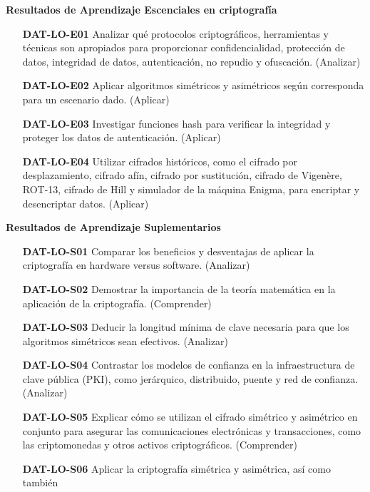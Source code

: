 \noindent \textbf{Resultados de Aprendizaje Escenciales en criptografía}
\begin{itemize}
\item[\textbf{DAT-LO-E01}] Analizar qué protocolos criptográficos, herramientas y técnicas son apropiados para proporcionar confidencialidad, protección de datos, integridad de datos, autenticación, no repudio y ofuscación. (Analizar)
\item[\textbf{DAT-LO-E02}] Aplicar algoritmos simétricos y asimétricos según corresponda para un escenario dado. (Aplicar)
\item[\textbf{DAT-LO-E03}] Investigar funciones hash para verificar la integridad y proteger los datos de autenticación. (Aplicar)
\item[\textbf{DAT-LO-E04}] Utilizar cifrados históricos, como el cifrado por desplazamiento, cifrado afín, cifrado por sustitución, cifrado de Vigenère, ROT-13, cifrado de Hill y simulador de la máquina Enigma, para encriptar y desencriptar datos. (Aplicar)
\end{itemize}


\noindent \textbf{Resultados de Aprendizaje Suplementarios}
\begin{itemize}
\item[\textbf{DAT-LO-S01}] Comparar los beneficios y desventajas de aplicar la criptografía en hardware versus software. (Analizar)
\item[\textbf{DAT-LO-S02}] Demostrar la importancia de la teoría matemática en la aplicación de la criptografía. (Comprender)
\item[\textbf{DAT-LO-S03}] Deducir la longitud mínima de clave necesaria para que los algoritmos simétricos sean efectivos. (Analizar)
\item[\textbf{DAT-LO-S04}] Contrastar los modelos de confianza en la infraestructura de clave pública (PKI), como jerárquico, distribuido, puente y red de confianza. (Analizar)
\item[\textbf{DAT-LO-S05}] Explicar cómo se utilizan el cifrado simétrico y asimétrico en conjunto para asegurar las comunicaciones electrónicas y transacciones, como las criptomonedas y otros activos criptográficos. (Comprender)
\item[\textbf{DAT-LO-S06}] Aplicar la criptografía simétrica y asimétrica, así como también
\end{itemize}

